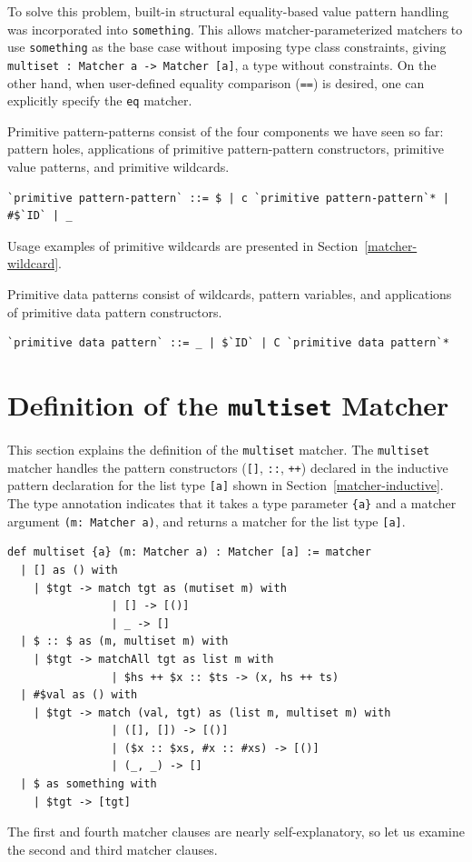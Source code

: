 To solve this problem, built-in structural equality-based value pattern handling was incorporated into \lstinline{something}.
This allows matcher-parameterized matchers to use \lstinline{something} as the base case without imposing type class constraints, giving
\lstinline|multiset : Matcher a -> Matcher [a]|,
a type without constraints.
On the other hand, when user-defined equality comparison (\lstinline{==}) is desired, one can explicitly specify the \lstinline{eq} matcher.

Primitive pattern-patterns consist of the four components we have seen so far: pattern holes, applications of primitive pattern-pattern constructors, primitive value patterns, and primitive wildcards.
\begin{lstlisting}[language=egison,numbers=none]
`primitive pattern-pattern` ::= $ | c `primitive pattern-pattern`* | #$`ID` | _
\end{lstlisting}
Usage examples of primitive wildcards are presented in Section~\ref{matcher-wildcard}.

Primitive data patterns consist of wildcards, pattern variables, and applications of primitive data pattern constructors.
\begin{lstlisting}[language=egison,numbers=none]
`primitive data pattern` ::= _ | $`ID` | C `primitive data pattern`*
\end{lstlisting}

\section{Definition of the \texttt{multiset} Matcher}\label{matcher-multiset}

This section explains the definition of the \lstinline{multiset} matcher.
The \lstinline{multiset} matcher handles the pattern constructors (\lstinline{[]}, \lstinline{::}, \lstinline{++}) declared in the inductive pattern declaration for the list type \lstinline{[a]} shown in Section~\ref{matcher-inductive}.
The type annotation indicates that it takes a type parameter \lstinline|{a}| and a matcher argument \lstinline|(m: Matcher a)|, and returns a matcher for the list type \lstinline|[a]|.
\begin{lstlisting}[language=egison]
def multiset {a} (m: Matcher a) : Matcher [a] := matcher
  | [] as () with
    | $tgt -> match tgt as (mutiset m) with
                | [] -> [()]
                | _ -> []
  | $ :: $ as (m, multiset m) with
    | $tgt -> matchAll tgt as list m with
                | $hs ++ $x :: $ts -> (x, hs ++ ts)
  | #$val as () with
    | $tgt -> match (val, tgt) as (list m, multiset m) with
                | ([], []) -> [()]
                | ($x :: $xs, #x :: #xs) -> [()]
                | (_, _) -> []
  | $ as something with
    | $tgt -> [tgt]
\end{lstlisting}
The first and fourth matcher clauses are nearly self-explanatory, so let us examine the second and third matcher clauses.

